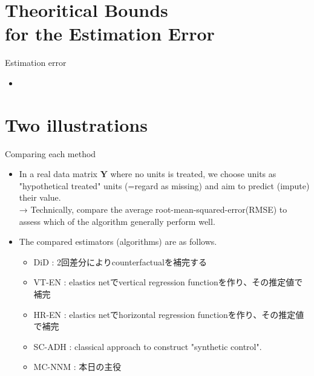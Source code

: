 \documentclass[xcolor=svgnames,aspectratio=169]{beamer}
\begin{document}
\section{Theoritical Bounds \\ for the Estimation Error}

\begin{frame}{Estimation error}
    \begin{itemize}
        \item 
    \end{itemize}
\end{frame}

\section{Two illustrations}

\begin{frame}{Comparing each method}
    \begin{itemize}
        \item In a real data matrix $\mathbf{Y}$ where \alert{no units is treated}, we choose units as "hypothetical treated" units (=regard as missing) and aim to predict (impute) their value. \\
        → Technically, compare the average root-mean-squared-error(RMSE) to assess which of the algorithm generally perform well.
        \item The compared estimators (algorithms) are as follows.
        \begin{itemize}
            \item DiD : 2回差分によりcounterfactualを補完する
            \item VT-EN : elastics netでvertical regression functionを作り、その推定値で補完
            \item HR-EN : elastics netでhorizontal regression functionを作り、その推定値で補完
            \item SC-ADH : classical approach to construct "synthetic control".
            \item MC-NNM : 本日の主役
        \end{itemize}
    \end{itemize}
\end{frame}
\end{document}
